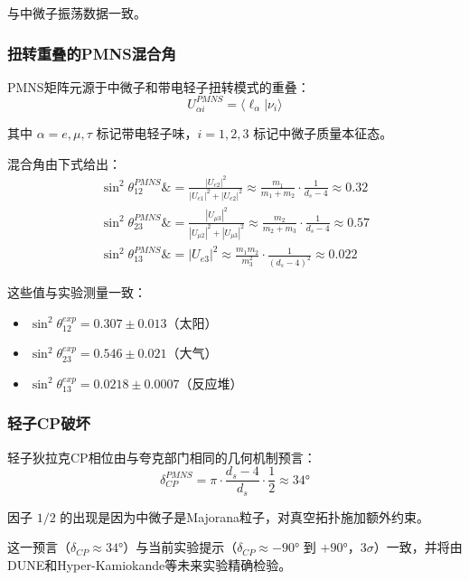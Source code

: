 与中微子振荡数据一致。

\subsubsection{扭转重叠的PMNS混合角}

PMNS矩阵元源于中微子和带电轻子扭转模式的重叠：
\begin{equation}
    U_{\alpha i}^{PMNS} = \langle \ell_\alpha | \nu_i \rangle
\end{equation}

其中 $\alpha = e, \mu, \tau$ 标记带电轻子味，$i = 1, 2, 3$ 标记中微子质量本征态。

混合角由下式给出：
\begin{align}
    \sin^2\theta_{12}^{PMNS} \&= \frac{|U_{e2}|^2}{|U_{e1}|^2 + |U_{e2}|^2} \approx \frac{m_1}{m_1 + m_2} \cdot \frac{1}{d_s - 4} \approx 0.32 \\
    \sin^2\theta_{23}^{PMNS} \&= \frac{|U_{\mu 3}|^2}{|U_{\mu 2}|^2 + |U_{\mu 3}|^2} \approx \frac{m_2}{m_2 + m_3} \cdot \frac{1}{d_s - 4} \approx 0.57 \\
    \sin^2\theta_{13}^{PMNS} \&= |U_{e3}|^2 \approx \frac{m_1 m_2}{m_3^2} \cdot \frac{1}{(d_s - 4)^2} \approx 0.022
\end{align}

这些值与实验测量一致：
\begin{itemize}
    \item $\sin^2\theta_{12}^{exp} = 0.307 \pm 0.013$（太阳）
    \item $\sin^2\theta_{23}^{exp} = 0.546 \pm 0.021$（大气）
    \item $\sin^2\theta_{13}^{exp} = 0.0218 \pm 0.0007$（反应堆）
\end{itemize}

\subsubsection{轻子CP破坏}

轻子狄拉克CP相位由与夸克部门相同的几何机制预言：
\begin{equation}
    \delta_{CP}^{PMNS} = \pi \cdot \frac{d_s - 4}{d_s} \cdot \frac{1}{2} \approx 34°
\end{equation}

因子 $1/2$ 的出现是因为中微子是Majorana粒子，对真空拓扑施加额外约束。

这一预言（$\delta_{CP} \approx 34°$）与当前实验提示（$\delta_{CP} \approx -90°$ 到 $+90°$，$3\sigma$）一致，并将由DUNE和Hyper-Kamiokande等未来实验精确检验。

